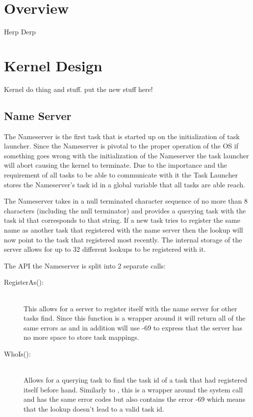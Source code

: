 \documentclass[pdftex,10pt,a4paper]{article}
\begin{document}

\section*{Overview}

Herp Derp


\section*{Kernel Design}

Kernel do thing and stuff. put the new stuff here!

\subsection*{Name Server}

The Nameserver is the first task that is started up on the initialization of
task launcher. Since the Nameserver is pivotal to the proper operation of the
OS if something goes wrong with the initialization of the Nameserver the task
launcher will abort causing the kernel to terminate. Due to the importance and
the requirement of all tasks to be able to communicate with it the Task Launcher
stores the Nameserver’s task id in a global variable that all tasks are able reach.

The Nameserver takes in a null terminated character sequence of no more than 8
characters (including the null terminator) and provides a querying task with
the task id that corresponds to that string. If a new task tries to register
the same name as another task that registered with the name server then the
lookup will now point to the task that registered most recently. The internal
storage of the server allows for up to 32 different lookups to be registered with it.

The API the Nameserver is split into 2 separate calls:
\begin{description}
\item[RegisterAs():] \hfill \\
This allows for a server to register itself with the name server for other tasks
find. Since this function is a wrapper around  it will return all of
the same errors as  and in addition will use -69 to express that the
server has no more space to store task mappings.

\item[WhoIs():] \hfill \\
Allows for a querying task to find the task id of a task that had registered
itself before hand. Similarly to , this is a wrapper around
the  system call and has the same error codes but also contains
the error -69 which means that the lookup doesn’t lead to a valid task id.
\end{description}
\end{document}
